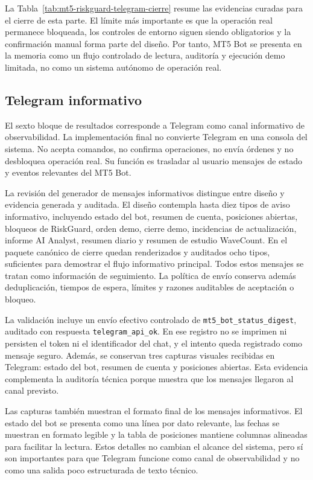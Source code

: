 

La Tabla~\ref{tab:mt5-riskguard-telegram-cierre} resume las evidencias curadas
para el cierre de esta parte. El l\'imite m\'as importante es que la operaci\'on
real permanece bloqueada, los controles de entorno siguen siendo obligatorios y
la confirmaci\'on manual forma parte del dise\~no. Por tanto, MT5 Bot se presenta
en la memoria como un flujo controlado de lectura, auditor\'ia y ejecuci\'on demo
limitada, no como un sistema aut\'onomo de operaci\'on real.

\subsection{Telegram informativo}
\label{subsec:resultados-telegram}

El sexto bloque de resultados corresponde a Telegram como canal informativo de
observabilidad. La implementaci\'on final no convierte Telegram en una consola
del sistema. No acepta comandos, no confirma operaciones, no env\'ia \'ordenes y
no desbloquea operaci\'on real. Su funci\'on es trasladar al usuario mensajes de
estado y eventos relevantes del MT5 Bot.

La revisi\'on del generador de mensajes informativos distingue entre dise\~no y
evidencia generada y auditada. El dise\~no contempla hasta diez tipos de aviso
informativo, incluyendo estado del bot, resumen de cuenta, posiciones abiertas,
bloqueos de RiskGuard, orden demo, cierre demo, incidencias de actualizaci\'on,
informe AI Analyst, resumen diario y resumen de estudio WaveCount. En el paquete
can\'onico de cierre quedan renderizados y auditados ocho tipos, suficientes para
demostrar el flujo informativo principal. Todos estos mensajes se tratan como
informaci\'on de seguimiento. La pol\'itica de env\'io conserva adem\'as
deduplicaci\'on, tiempos de espera, l\'imites y razones auditables de aceptaci\'on
o bloqueo.

La validaci\'on incluye un env\'io efectivo controlado de
\texttt{mt5\_bot\_status\_digest}, auditado con respuesta
\texttt{telegram\_api\_ok}. En ese registro no se imprimen ni persisten el token
ni el identificador del chat, y el intento queda registrado como mensaje seguro.
Adem\'as, se conservan tres capturas visuales recibidas en Telegram: estado del
bot, resumen de cuenta y posiciones abiertas. Esta evidencia complementa la
auditor\'ia t\'ecnica porque muestra que los mensajes llegaron al canal previsto.

Las capturas tambi\'en muestran el formato final de los mensajes informativos.
El estado del bot se presenta como una l\'inea por dato relevante, las fechas se
muestran en formato legible y la tabla de posiciones mantiene columnas
alineadas para facilitar la lectura. Estos detalles no cambian el alcance del
sistema, pero s\'i son importantes para que Telegram funcione como canal de
observabilidad y no como una salida poco estructurada de texto t\'ecnico.

